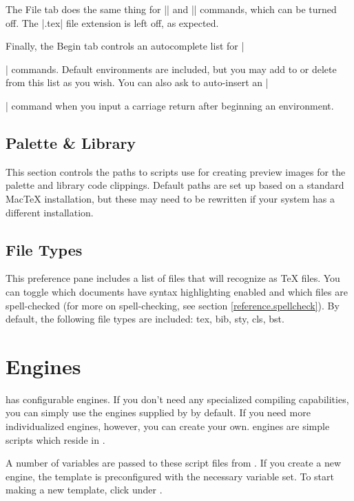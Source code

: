 The File tab does the same thing for || and || commands, which can be turned off. The |.tex| file extension is left off, as expected.

Finally, the Begin tab controls an autocomplete list for |\begin{environment}| commands. Default environments are included, but you may add to or delete from this list as you wish. You can also ask \texnicle to auto-insert an |\end{environment}| command when you input a carriage return after beginning an environment.

\subsection{Palette \& Library}
\label{reference.prefs.palettelibrary}
This section controls the paths to scripts use for creating preview images for the palette and library code clippings. Default paths are set up based on a standard MacTeX installation, but these may need to be rewritten if your system has a different installation.

\subsection{File Types}
\label{reference.prefs.filetypes}
This preference pane includes a list of files that \texnicle will recognize as {\TeX} files. You can toggle which documents have syntax highlighting enabled and which files are spell-checked (for more on spell-checking, see section \ref{reference.spellcheck}). By default, the following file types are included: tex, bib, sty, cls, bst.

\section{Engines}
\label{reference.engines}
\texnicle has configurable engines. If you don't need any specialized compiling capabilities, you can simply use the engines supplied by \texnicle by default. If you need more individualized engines, however, you can create your own. \texnicle engines are simple scripts which reside in .

A number of variables are passed to these script files from \texnicle. If you create a new engine, the template is preconfigured with the necessary variable set. To start making a new template, click  under .

